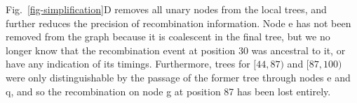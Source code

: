 \documentclass{article}
\newcommand{\noderef}[1]{\textsf{#1}}
\begin{document}
Fig.~\ref{fig-simplification}D removes all unary nodes from the
local trees, and further reduces the precision of
recombination information. Node \noderef{e} has not been
removed from the graph because it is coalescent in the
final tree, but we no longer know that the recombination
event at position 30 was ancestral to it, or have
any indication of its timings. Furthermore,
trees for $[44, 87)$ and $[87, 100)$ were only distinguishable
by the passage of the former tree through nodes \noderef{e}
and \noderef{q}, and so the recombination on node \noderef{g}
at position 87 has been lost entirely.



\end{document}

